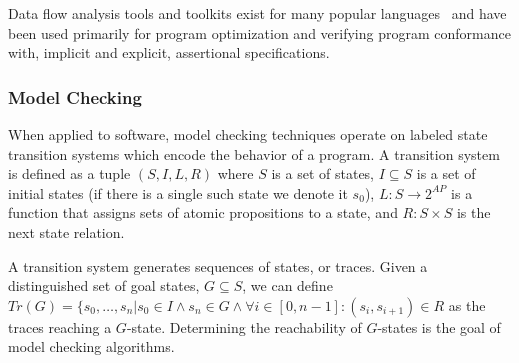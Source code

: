 Data flow analysis tools and toolkits exist for many popular 
languages~\cite{SOOT,WALA,others}
and have been used primarily for program optimization and
verifying program conformance with, implicit and explicit,
assertional specifications.

\subsubsection{Model Checking}
When applied to software, model checking techniques operate on 
labeled state transition
systems which encode the behavior of a program.
A transition system is defined as a tuple
$(S,I,L,R)$ where $S$ is a set of states,
$I \subseteq S$ is a set of initial states (if there is a single
such state we denote it $s_0$), 
$L : S \rightarrow 2^{AP}$ is a function that assigns
sets of atomic propositions to a state, and
$R : S \times S$ is the next state relation.

A transition system generates sequences of states, or traces.
Given a distinguished set of goal states, $G \subseteq S$,
we can define $Tr(G) = \{s_0, \ldots, s_n \vert s_0 \in I \wedge
s_n \in G \wedge \forall i \in [0,n-1] : (s_i,s_{i+1}) \in R$
as the traces reaching a $G$-state.
Determining the reachability of $G$-states is the goal of
model checking algorithms.


